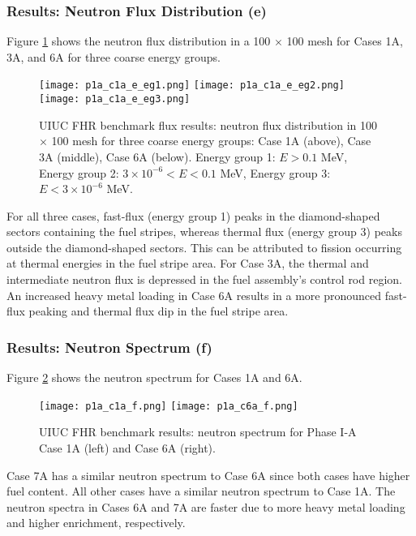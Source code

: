 \subsubsection{Results: Neutron Flux Distribution (e)}
Figure \ref{fig:phase1a-e} shows the neutron flux distribution in a 100 $\times$ 
100 mesh for Cases 1A, 3A, and 6A for three coarse energy groups. 
\begin{figure}[htbp]
    \centering
    \texttt{[image: p1a\_c1a\_e\_eg1.png]} 
    \texttt{[image: p1a\_c1a\_e\_eg2.png]} 
    \texttt{[image: p1a\_c1a\_e\_eg3.png]} 
    \caption{\gls{UIUC} \gls{FHR} benchmark flux results: neutron flux 
    distribution in 100 $\times$ 100 mesh for three coarse energy groups: Case 
    1A (above), Case 3A (middle), Case 6A (below). Energy group 1: $E > 0.1$ MeV, 
    Energy group 2: $3 \times 10^{-6} < E < 0.1$ MeV, Energy group 3: $E < 3 \times 10^{-6}$ MeV. }
    \label{fig:phase1a-e}
\end{figure}
For all three cases, fast-flux (energy group 1) peaks in the diamond-shaped sectors containing 
the fuel stripes, whereas thermal flux (energy group 3) peaks outside the diamond-shaped 
sectors. 
This can be attributed to fission occurring at thermal energies in the fuel stripe area. 
For Case 3A, the thermal and intermediate neutron flux is depressed in the fuel 
assembly's control rod region.  
An increased heavy metal loading in Case 6A results in a more pronounced 
fast-flux peaking and thermal flux dip in the fuel stripe area. 

\subsubsection{Results: Neutron Spectrum (f)}
Figure \ref{fig:phase1a-f} shows the neutron spectrum for Cases 1A and 6A. 
\begin{figure}[htbp]
    \centering
    \texttt{[image: p1a\_c1a\_f.png]} 
    \texttt{[image: p1a\_c6a\_f.png]} 
    \caption{\gls{UIUC} \gls{FHR} benchmark results: neutron spectrum for 
    Phase I-A Case 1A (left) and Case 6A (right).}
    \label{fig:phase1a-f}
\end{figure}
Case 7A has a similar neutron spectrum to Case 6A since both cases have 
higher fuel content. 
All other cases have a similar neutron spectrum to Case 1A.
The neutron spectra in Cases 6A and 7A are faster due to more heavy metal 
loading and higher enrichment, respectively.  

